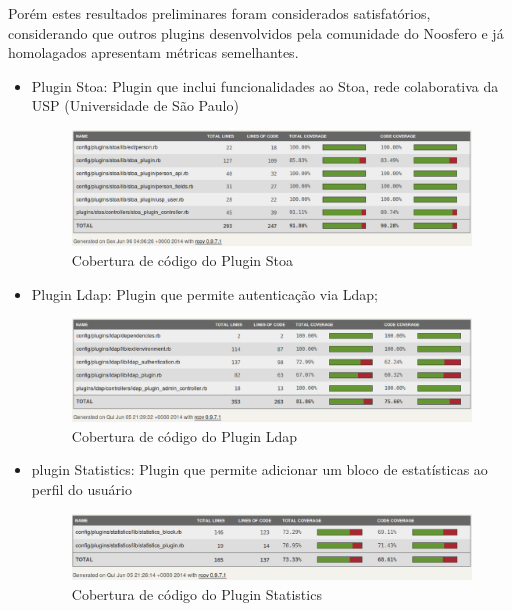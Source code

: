 Porém estes resultados preliminares foram considerados satisfatórios, considerando que outros plugins desenvolvidos pela comunidade do Noosfero e já homolagados apresentam métricas semelhantes.
\begin{itemize}
\item Plugin Stoa: Plugin que inclui funcionalidades ao Stoa, rede colaborativa da USP (Universidade de São Paulo)

\begin{figure}[!h]
    \centering
    \includegraphics[keepaspectratio=false,scale=0.45]
      {figuras/stoa.eps}
    \caption{Cobertura de código do Plugin Stoa}
    \label{consideracoes_cobertura3}
\end{figure}

\item Plugin Ldap: Plugin que permite autenticação via Ldap;

\begin{figure}[!h]
    \centering
    \includegraphics[keepaspectratio=false,scale=0.45]
      {figuras/ldap.eps}
    \caption{Cobertura de código do Plugin Ldap}
    \label{consideracoes_cobertura4}
\end{figure}

\item plugin Statistics: Plugin que permite adicionar um bloco de estatísticas ao perfil do usuário

\begin{figure}[!h]
    \centering
    \includegraphics[keepaspectratio=false,scale=0.45]
      {figuras/statistics.eps}
    \caption{Cobertura de código do Plugin Statistics}
    \label{consideracoes_cobertura3}
\end{figure}

\end{itemize}

